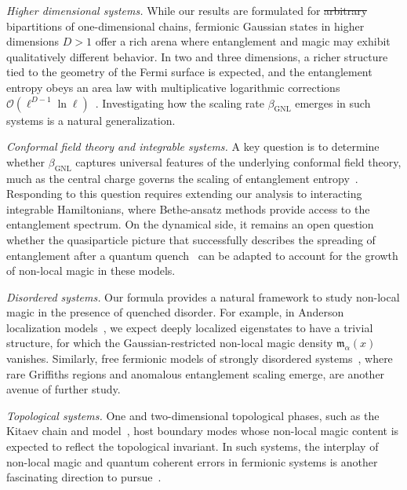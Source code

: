 \documentclass[prx,twocolumn,superscriptaddress,aps,10pt, frontmatterverbose, reprint,footinbib,longbibliography=true]{revtex4-2}
\newcommand{\RENYI}{\alpha}
\providecommand{\DIFaddtex}[1]{{\protect\color{red}\uwave{#1}}} %
\providecommand{\DIFdeltex}[1]{{\protect\color{red}\sout{#1}}}                      %
\providecommand{\DIFaddbegin}{\protect\color{red}} %
\providecommand{\DIFaddend}{\protect\color{black}} %
\providecommand{\DIFdelbegin}{} %
\providecommand{\DIFdelend}{} %
\providecommand{\DIFadd}[1]{\texorpdfstring{\DIFaddtex{#1}}{#1}} %
\providecommand{\DIFdel}[1]{\texorpdfstring{\DIFdeltex{#1}}{}} %
\newcommand{\DIFscaledelfig}{0.5}
\newlength{\DIFdelgraphicswidth} %
\newlength{\DIFdelgraphicsheight} %
\newcommand{\DIFaddincludegraphics}[2][]{{\color{blue}\fbox{\DIFOincludegraphics[#1]{#2}}}} %
\newcommand{\DIFdelincludegraphics}[2][]{%
\sbox{\DIFdelgraphicsbox}{\DIFOincludegraphics[#1]{#2}}%
\settoboxwidth{\DIFdelgraphicswidth}{\DIFdelgraphicsbox} %
\settoboxtotalheight{\DIFdelgraphicsheight}{\DIFdelgraphicsbox} %
\scalebox{\DIFscaledelfig}{%
\parbox[b]{\DIFdelgraphicswidth}{\usebox{\DIFdelgraphicsbox}\\[-\baselineskip] \rule{\DIFdelgraphicswidth}{0em}}\llap{\resizebox{\DIFdelgraphicswidth}{\DIFdelgraphicsheight}{%
\setlength{\unitlength}{\DIFdelgraphicswidth}%
\begin{picture}(1,1)%
\thicklines\linethickness{2pt} %
{\color[rgb]{1,0,0}\put(0,0){\framebox(1,1){}}}%
{\color[rgb]{1,0,0}\put(0,0){\line( 1,1){1}}}%
{\color[rgb]{1,0,0}\put(0,1){\line(1,-1){1}}}%
\end{picture}%
}\hspace*{3pt}}} %
} %
\DeclareRobustCommand{\DIFaddbegin}{\DIFOaddbegin \let\includegraphics\DIFaddincludegraphics} %
\DeclareRobustCommand{\DIFaddend}{\DIFOaddend \let\includegraphics\DIFOincludegraphics} %
\DeclareRobustCommand{\DIFdelbegin}{\DIFOdelbegin \let\includegraphics\DIFdelincludegraphics} %
\DeclareRobustCommand{\DIFdelend}{\DIFOaddend \let\includegraphics\DIFOincludegraphics} %
\begin{document}
\emph{Higher dimensional systems.}
While our results are formulated for \DIFdelbegin \DIFdel{arbitrary }\DIFdelend \DIFaddbegin \DIFadd{contiguous }\DIFaddend bipartitions of one-dimensional chains, fermionic Gaussian states in higher dimensions $D>1$ offer a rich arena where entanglement and magic may exhibit qualitatively different behavior. In two and three dimensions, a richer structure tied to the geometry of the Fermi surface is expected, and the entanglement entropy obeys an area law with multiplicative logarithmic corrections $\mathcal{O}(\ell^{D-1}\ln\ell)$~\cite{swingle2010entanglement}. 
Investigating how the scaling rate $\beta_\mathrm{GNL}$ emerges in such systems is a natural generalization.


\emph{Conformal field theory and integrable systems.}
A key question is to determine whether $\beta_{\mathrm{GNL}}$ captures universal features of the underlying conformal field theory, much as the central charge governs the scaling of entanglement entropy~\cite{Calabrese2004entanglement}.
Responding to this question requires extending our analysis to interacting integrable Hamiltonians, where Bethe-ansatz methods provide access to the entanglement spectrum.
On the dynamical side, it remains an open question whether the quasiparticle picture that successfully describes the spreading of entanglement after a quantum quench~\cite{Alba_2017,alba2019,Kudler_Flam_2021} can be adapted to account for the growth of non-local magic in these models.

\emph{Disordered systems.}
Our formula provides a natural framework to study non-local magic in the presence of quenched disorder. 
For example, in Anderson localization models~\cite{evers,sierant2020}, we expect deeply localized eigenstates to have a trivial structure, for which the Gaussian-restricted non-local magic density $\mathfrak{m}_\RENYI(x)$ vanishes. 
Similarly, free fermionic models of strongly disordered systems~\cite{IGLOI_2005,Monthus_2018,ruggiero2022}, where rare Griffiths regions and anomalous entanglement scaling emerge, are another avenue of further study.

\emph{Topological systems.}
One and two-dimensional topological phases, such as the Kitaev chain and model~\cite{Kitaev2001chain,Kitaev_2006}, host boundary modes whose non-local magic content is expected to reflect the topological invariant.
In such systems, the interplay of non-local magic and quantum coherent errors in fermionic systems is another fascinating direction to pursue~\cite{beri,gskb-t5ql}.
\end{document}
